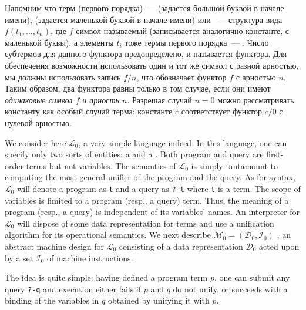 \label{warren2}\secdown

Напомним что терм (первого порядка)\ ---
 (задается большой буквой в начале
имени),  (задается маленькой буквой в
начале имени) или \ --- структура вида
$f(t_1,\ldots,t_n)$, где $f$ символ называемый
 (записывается аналогично константе, с
маленькой буквы), а элементы $t_i$ тоже термы первого порядка\ ---
. Число субтермов для данного функтора
предопределено, и называется  функтора.
Для обеспечения возможности использовать один и тот же символ с разной арностью,
мы должны использовать запись $f/n$, что обозначает функтор $f$ с арностью $n$.
Таким образом, два функтора равны только в том случае, если они имеют
\emph{одинаковые символ $f$ и арность $n$}. Разрешая случай $n=0$ можно
рассматривать константу как особый случай терма: константе $c$ соответствует
функтор $c/0$ с нулевой арностью.

We consider here $\mathcal L_0$, a very simple language indeed. In this
language, one can specify only two sorts of entities: a  and a .
Both program and query are first-order terms but not variables. The semantics of
$\mathcal L_0$ is simply tantamount to computing the most general unifier of the
program and the query. As for syntax, $\mathcal L_0$ will denote a program as
\verb|t| and a query as \verb$?-t$ where \verb$t$ is a term. The scope of
variables is limited to a program (resp., a query) term. Thus, the meaning of a
program (resp., a query) is independent of its variables’ names. An interpreter
for $\mathcal L_0$ will dispose of some data representation for terms and use a
unification algorithm for its operational semantics. We next describe $\mathcal
M_0 = (\mathcal D_0,\mathcal I_0)$ , an abstract machine design for $\mathcal
L_0$ consisting of a data representation $\mathcal D_0$ acted upon by a set
$\mathcal I_0$ of machine instructions.

The idea is quite simple: having defined a program term $p$, one can submit any
query \verb|?-q| and execution either fails if $p$ and $q$ do not unify, or
succeeds with a binding of the variables in $q$ obtained by unifying it with
$p$.





\secup
